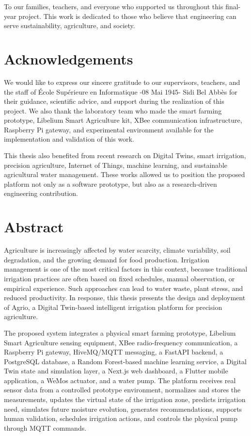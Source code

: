 To our families, teachers, and everyone who supported us throughout this final-year project. This work is dedicated to those who believe that engineering can serve sustainability, agriculture, and society.

\chapter*{Acknowledgements}

We would like to express our sincere gratitude to our supervisors, teachers, and the staff of École Supérieure en Informatique -08 Mai 1945- Sidi Bel Abbès for their guidance, scientific advice, and support during the realization of this project. We also thank the laboratory team who made the smart farming prototype, Libelium Smart Agriculture kit, XBee communication infrastructure, Raspberry Pi gateway, and experimental environment available for the implementation and validation of this work.

This thesis also benefited from recent research on Digital Twins, smart irrigation, precision agriculture, Internet of Things, machine learning, and sustainable agricultural water management. These works allowed us to position the proposed platform not only as a software prototype, but also as a research-driven engineering contribution.

\chapter*{Abstract}

Agriculture is increasingly affected by water scarcity, climate variability, soil degradation, and the growing demand for food production. Irrigation management is one of the most critical factors in this context, because traditional irrigation practices are often based on fixed schedules, manual observation, or empirical experience. Such approaches can lead to water waste, plant stress, and reduced productivity. In response, this thesis presents the design and deployment of Agrio, a Digital Twin-based intelligent irrigation platform for precision agriculture.

The proposed system integrates a physical smart farming prototype, Libelium Smart Agriculture sensing equipment, XBee radio-frequency communication, a Raspberry Pi gateway, HiveMQ/MQTT messaging, a FastAPI backend, a PostgreSQL database, a Random Forest-based machine learning service, a Digital Twin state and simulation layer, a Next.js web dashboard, a Flutter mobile application, a WeMos actuator, and a water pump. The platform receives real sensor data from a controlled prototype environment, normalizes and stores the measurements, updates the virtual state of the irrigation zone, predicts irrigation need, simulates future moisture evolution, generates recommendations, supports human validation, schedules irrigation actions, and controls the physical pump through MQTT commands.


